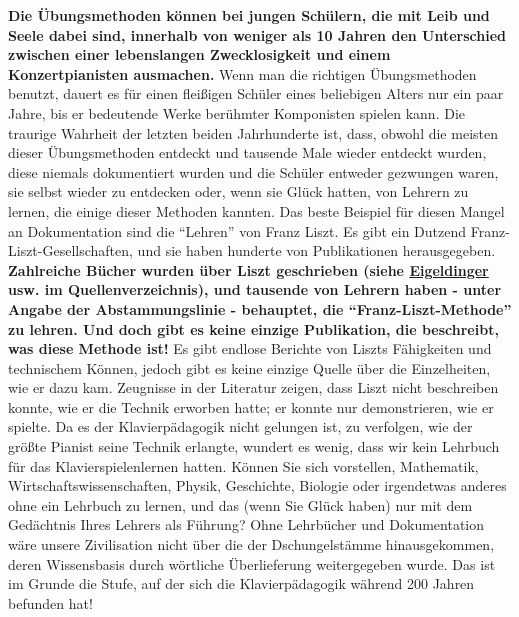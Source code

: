\textbf{Die Übungsmethoden können bei jungen Schülern, die mit Leib und Seele dabei sind, innerhalb von weniger als 10 Jahren den Unterschied zwischen einer lebenslangen Zwecklosigkeit und einem Konzertpianisten ausmachen.}
Wenn man die richtigen Übungsmethoden benutzt, dauert es für einen fleißigen Schüler eines beliebigen Alters nur ein paar Jahre, bis er bedeutende Werke berühmter Komponisten spielen kann.
Die traurige Wahrheit der letzten beiden Jahrhunderte ist, dass, obwohl die meisten dieser Übungsmethoden entdeckt und tausende Male wieder entdeckt wurden, diese niemals dokumentiert wurden und die Schüler entweder gezwungen waren, sie selbst wieder zu entdecken oder, wenn sie Glück hatten, von Lehrern zu lernen, die einige dieser Methoden kannten.
Das beste Beispiel für diesen Mangel an Dokumentation sind die \enquote{Lehren} von Franz Liszt.
Es gibt ein Dutzend Franz-Liszt-Gesellschaften, und sie haben hunderte von Publikationen herausgegeben.
\textbf{Zahlreiche Bücher wurden über Liszt geschrieben (siehe \hyperref[Eigeldinger]{Eigeldinger} usw. im Quellenverzeichnis), und tausende von Lehrern haben - unter Angabe der Abstammungslinie - behauptet, die \enquote{Franz-Liszt-Methode} zu lehren.
Und doch gibt es keine einzige Publikation, die beschreibt, was diese Methode ist!}
Es gibt endlose Berichte von Liszts Fähigkeiten und technischem Können, jedoch gibt es keine einzige Quelle über die Einzelheiten, wie er dazu kam.
Zeugnisse in der Literatur zeigen, dass Liszt nicht beschreiben konnte, wie er die Technik erworben hatte; er konnte nur demonstrieren, wie er spielte.
Da es der Klavierpädagogik nicht gelungen ist, zu verfolgen, wie der größte Pianist seine Technik erlangte, wundert es wenig, dass wir kein Lehrbuch für das Klavierspielenlernen hatten.
Können Sie sich vorstellen, Mathematik, Wirtschaftswissenschaften, Physik, Geschichte, Biologie oder irgendetwas anderes ohne ein Lehrbuch zu lernen, und das (wenn Sie Glück haben) nur mit dem Gedächtnis Ihres Lehrers als Führung?
Ohne Lehrbücher und Dokumentation wäre unsere Zivilisation nicht über die der Dschungelstämme hinausgekommen, deren Wissensbasis durch wörtliche Überlieferung weitergegeben wurde.
Das ist im Grunde die Stufe, auf der sich die Klavierpädagogik während 200 Jahren befunden hat!

